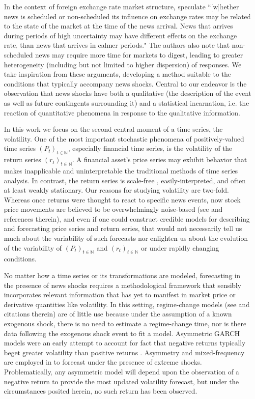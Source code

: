 \documentclass[11pt,3p,review,authoryear]{elsarticle}
\theoremstyle{definition}
\begin{document}
In the context of foreign exchange rate market structure, \citet{dominguez2006defines} speculate ``[w]hether news is scheduled or non-scheduled its influence on exchange rates may be related
to the state of the market at the time of the news arrival.  News that arrives during periods of
high uncertainty may have different effects on the exchange rate, than news that arrives in
calmer periods." The authors also note that non-scheduled news may require more time for markets to digest, leading to greater heterogeneity (including but not limited to higher dispersion) of responses.  We take inspiration from these arguments, developing a method suitable to the conditions that typically accompany news shocks.  Central to our endeavor is the observation that news shocks have both a qualitative (the description of the event as well as future contingents surrounding it) and a statistical incarnation, i.e. the reaction of quantitative phenomena in response to the qualitative information.

In this work we focus on the second central moment of a time series, the volatility.  One of the most important stochastic phenomena of positively-valued time series $(P_{t})_{t\in\mathbb{N}}$, especially financial time series, is the volatility of the return series $(r_{t})_{t\in\mathbb{N}}$.  A financial asset's price series may exhibit behavior that makes inapplicable and uninterpretable the traditional methods of time series analysis.  In contrast, the return series is scale-free \citep{tsay2005analysis}, easily-interpreted, and often at least weakly stationary.  Our reasons for studying volatility are two-fold.  Whereas once returns were thought to react to specific news events, now stock price movements are believed to be overwhelmingly noise-based (see \citet{boudoukh2019information} and references therein), and even if one could construct credible models for describing and forecasting price series and return series, that would not necessarily tell us much about the variability of such forecasts nor enlighten us about the evolution of the variability of $(P_{t})_{t\in\mathbb{N}}$ and $(r_{t})_{t\in\mathbb{N}}$ or under rapidly changing conditions. 

No matter how a time series or its transformations are modeled, forecasting in the presence of news shocks requires a methodological framework that sensibly incorporates relevant information that has yet to manifest in market price or derivative quantities like volatility.  In this setting, regime-change models (see \citet{bauwens2006regime} and citations therein) are of little use because under the assumption of a known exogenous shock, there is no need to estimate a regime-change time, nor is there data following the exogenous shock event to fit a model.  Asymmetric GARCH models were an early attempt to account for fact that negative returns typically beget greater volatility than positive returns \citep{hansen2012realized}.  Asymmetry and mixed-frequency are employed in \cite{wang2020forecasting} to forecast under the presence of extreme shocks.  Problematically, any asymmetric model will depend upon the observation of a negative return to provide the most updated volatility forecast, but under the circumstances posited herein, no such return has been observed.
\end{document}
